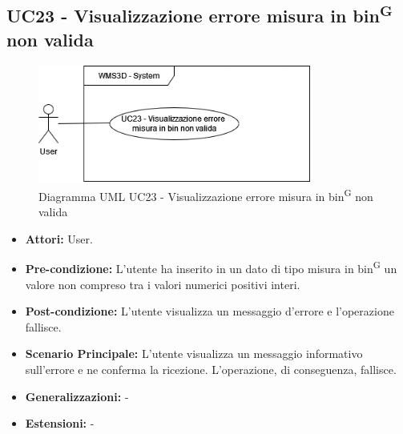 \subsection{UC23 - Visualizzazione errore misura in bin\textsuperscript{G} non valida}
\begin{figure}[H]
  \centering
  \includegraphics[width=0.8\textwidth]{UC_diagrams_21-26/UC23.drawio.png}
   \caption{Diagramma UML UC23 - Visualizzazione errore misura in bin\textsuperscript{G} non valida}
\end{figure}
\begin{itemize}
    \item \textbf{Attori:} User.
    \item \textbf{Pre-condizione:}  L'utente ha inserito in un dato di tipo misura in bin\textsuperscript{G} un valore non compreso tra i valori numerici positivi interi.
    \item \textbf{Post-condizione:} L'utente visualizza un messaggio d'errore e l'operazione fallisce.
    \item \textbf{Scenario Principale:}  L'utente visualizza un messaggio informativo sull'errore e ne conferma la ricezione. L'operazione, di conseguenza, fallisce.
    \item \textbf{Generalizzazioni:} -
    \item \textbf{Estensioni:} -
\end{itemize}